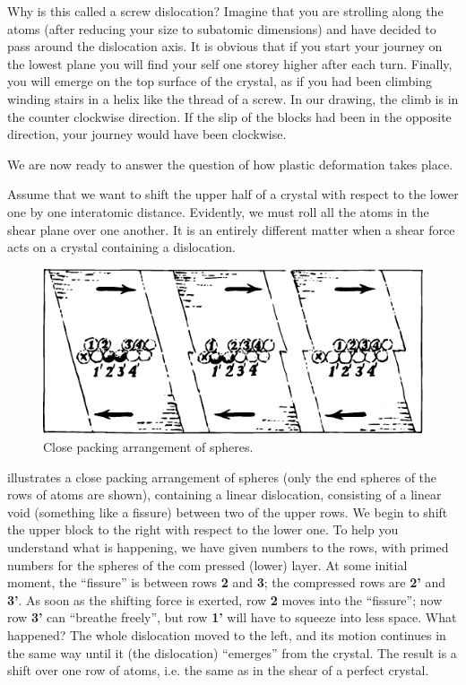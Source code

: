 Why is this called a screw dislocation? Imagine that you are strolling along the atoms (after reducing your size to subatomic dimensions) and have decided to pass around the dislocation axis. It is obvious that if you start your journey on the lowest plane you will find your­ self one storey higher after each turn. Finally, you will emerge on the top surface of the crystal, as if you had been climbing winding stairs in a helix like the thread of a screw. In our drawing, the climb is in the counter­ clockwise direction. If the slip of the blocks had been in the opposite direction, your journey would have been clockwise.

We are now ready to answer the question of how plastic deformation takes place.

Assume that we want to shift the upper half of a crystal with respect to the lower one by one interatomic distance. Evidently, we must roll all the atoms in the shear plane over one another. It is an entirely different matter when a shear force acts on a crystal containing a dislocation.

\begin{figure}[!ht]
\centering
\includegraphics[width=\textwidth]{figures/fig-06-08.pdf}
\caption{Close packing arrangement of spheres.}
\label{fig-6.8}
\end{figure}


 illustrates a close packing arrangement of spheres (only the end spheres of the rows of atoms are shown), containing a linear dislocation, consisting of a linear void (something like a fissure) between two of the upper rows. We begin to shift the upper block to the right with respect to the lower one. To help you understand what is happening, we have given numbers to the rows, with primed numbers for the spheres of the com­ pressed (lower) layer. At some initial moment, the ``fissure'' is between rows \textbf{2} and \textbf{3}; the compressed rows are \textbf{2'} and \textbf{3'}. As soon as the shifting force is exerted, row \textbf{2} moves into the ``fissure''; now row \textbf{3'} can ``breathe freely'', but row \textbf{1'} will have to squeeze into less space. What happened? The whole dislocation moved to the left, and its mo­tion continues in the same way until it (the dislocation) ``emerges'' from the crystal. The result is a shift over one row of atoms, i.e. the same as in the shear of a perfect crystal.

